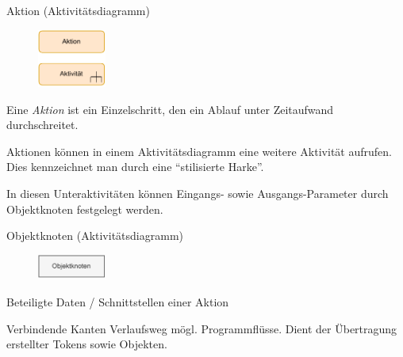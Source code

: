 \begin{defi}{Aktion (Aktivitätsdiagramm)}
    \begin{figure}
        \centering
        \includegraphics[width=0.2\textwidth]{includes/figures/defi_diagrams_activity_aktion.pdf}
    \end{figure}
    Eine \emph{Aktion} ist ein Einzelschritt, den ein Ablauf unter Zeitaufwand durchschreitet.

    Aktionen können in einem Aktivitätsdiagramm eine weitere Aktivität aufrufen.
    Dies kennzeichnet man durch eine \enquote{stilisierte Harke}.

    In diesen Unteraktivitäten können Eingangs- sowie Ausgangs-Parameter durch Objektknoten festgelegt werden.
\end{defi}

\begin{defi}{Objektknoten (Aktivitätsdiagramm)}
    \begin{figure}
        \centering
        \includegraphics[width=0.2\textwidth]{includes/figures/defi_diagrams_activity_objektknoten.pdf}
    \end{figure}
    Beteiligte Daten / Schnittstellen einer Aktion

    \vspace{1cm}
\end{defi}

\begin{defi}{Verbindende Kanten}
    Verlaufsweg mögl. Programmflüsse.
    Dient der Übertragung erstellter Tokens sowie Objekten.
\end{defi}

